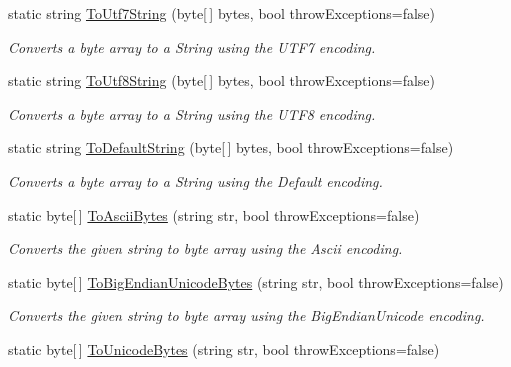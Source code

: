 \begin{DoxyCompactItemize}
static string \hyperlink{class_ultimate_1_1_utilities_1_1_string_utils_ab78bd1eb7d52650b94f69f856ed1df2c}{To\+Utf7\+String} (byte\mbox{[}$\,$\mbox{]} bytes, bool throw\+Exceptions=false)
\begin{DoxyCompactList}\small\item\em Converts a byte array to a String using the U\+T\+F7 encoding. \end{DoxyCompactList}\item 
static string \hyperlink{class_ultimate_1_1_utilities_1_1_string_utils_a873151512ec4cca0d057d31faca3fddc}{To\+Utf8\+String} (byte\mbox{[}$\,$\mbox{]} bytes, bool throw\+Exceptions=false)
\begin{DoxyCompactList}\small\item\em Converts a byte array to a String using the U\+T\+F8 encoding. \end{DoxyCompactList}\item 
static string \hyperlink{class_ultimate_1_1_utilities_1_1_string_utils_a2829ab19c4f0b7b916a5cb4b35edadef}{To\+Default\+String} (byte\mbox{[}$\,$\mbox{]} bytes, bool throw\+Exceptions=false)
\begin{DoxyCompactList}\small\item\em Converts a byte array to a String using the Default encoding. \end{DoxyCompactList}\item 
static byte\mbox{[}$\,$\mbox{]} \hyperlink{class_ultimate_1_1_utilities_1_1_string_utils_af308ef92d50868861a55e1c56a55d4f8}{To\+Ascii\+Bytes} (string str, bool throw\+Exceptions=false)
\begin{DoxyCompactList}\small\item\em Converts the given string to byte array using the Ascii encoding. \end{DoxyCompactList}\item 
static byte\mbox{[}$\,$\mbox{]} \hyperlink{class_ultimate_1_1_utilities_1_1_string_utils_a6ab4dfdc8a68eed5ac1be43f7ab7909b}{To\+Big\+Endian\+Unicode\+Bytes} (string str, bool throw\+Exceptions=false)
\begin{DoxyCompactList}\small\item\em Converts the given string to byte array using the Big\+Endian\+Unicode encoding. \end{DoxyCompactList}\item 
static byte\mbox{[}$\,$\mbox{]} \hyperlink{class_ultimate_1_1_utilities_1_1_string_utils_a17e170a1a617a7c70c269eccb198c4a9}{To\+Unicode\+Bytes} (string str, bool throw\+Exceptions=false)

\end{DoxyCompactItemize}
